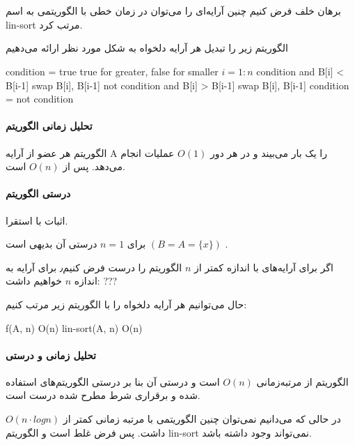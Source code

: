 \section{}
\proof برهان خلف
فرض کنیم 
چنین آرایه‌ای را می‌توان در زمان خطی با الگوریتمی به اسم lin-sort مرتب کرد. 

الگوریتم زیر را 
تبدیل هر آرایه دلخواه به شکل مورد نظر ارائه می‌دهیم
\begin{latin}
\begin{codebox}
\li condition = true \Comment true for greater, false for smaller
\li	\For $i=1:n$ \Then
	\li \If condition and B[i] < B[i-1] \Then 
	\li	swap B[i], B[i-1]
	\End
	\li \If not condition and B[i] > B[i-1] \Then
	\li swap B[i], B[i-1]
	\End
	condition = not condition
	\End
\end{codebox}
\end{latin}

\paragraph{تحلیل زمانی الگوریتم}
 الگوریتم هر عضو از آرایه A را یک بار می‌بیند و در هر دور $O(1)$ عملیات انجام می‌دهد.
پس از 
$O(n)$ 
است.

\paragraph{درستی الگوریتم}
اثبات با استقرا.

برای $n=1$ درستی آن بدیهی است 
$(B = A = \{ x \})$
.

اگر برای آرایه‌های با اندازه کمتر از 
$n$
الگوریتم را درست فرض کنیم٫ برای آرایه به اندازه 
$n$
خواهیم داشت:
???

حال می‌توانیم هر آرایه دلخواه را با الگوریتم زیر مرتب کنیم:
\begin{latin}
\begin{codebox}
	\li f(A, n)	\Comment O(n)
	\li lin-sort(A, n) \Comment O(n)
\end{codebox}
\end{latin}

\paragraph{تحلیل زمانی و درستی}
الگوریتم از مرتبه‌زمانی 
$O(n)$ 
است و درستی آن بنا بر درستی الگوریتم‌های استفاده شده و برقراری شرط مطرح شده درست است.

در حالی که می‌دانیم نمی‌توان چنین الگوریتمی با مرتبه زمانی کمتر از 
$O(n\cdot logn)$
داشت. 
پس فرض غلط است و الگوریتم 
lin-sort
نمی‌تواند وجود داشته باشد.

